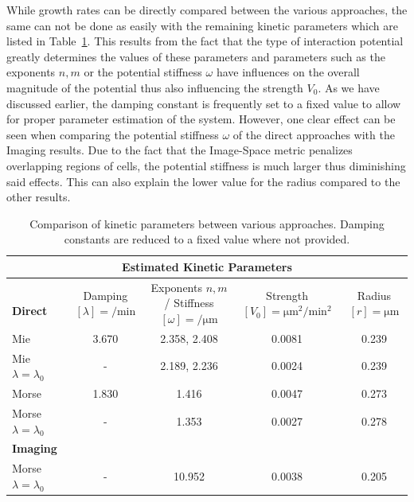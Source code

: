 While growth rates can be directly compared between the various approaches, the same
can not be done
as easily with the remaining kinetic parameters which are listed in
Table~\ref{tab:comparison-kinetic-parameters}.
This results from the fact that the type of interaction potential greatly determines
the values of
these parameters and parameters such as the exponents $n,m$ or the potential
stiffness $\omega$ have
influences on the overall magnitude of the potential thus also influencing the strength $V_0$.
As we have discussed earlier, the damping constant is frequently set to a fixed value
to allow for
proper parameter estimation of the system.
However, one clear effect can be seen when comparing the potential stiffness $\omega$
of the direct
approaches with the Imaging results.
Due to the fact that the Image-Space metric penalizes overlapping regions of cells,
the potential
stiffness is much larger thus diminishing said effects.
This can also explain the lower value for the radius compared to the other results.

\begin{table}[H]
    \centering
    \begin{tabular}{l c c c c}
        \multicolumn{5}{c}{Estimated Kinetic Parameters}\\
        \toprule
        \makecell[l]{\\\textbf{Direct}}
        & \makecell{Damping\\$[\lambda]=\unit{\per\minute}$}
        & \makecell{Exponents $n,m$/\\Stiffness $[\omega]=\unit{\per\micro\metre}$}
        & \makecell{Strength\\$[V_0]=\unit{\micro\metre^2\per\minute^2}$}
        & \makecell{Radius\\$[r]=\unit{\micro\metre}$}\\
        \midrule
        Mie                         & 3.670 & 2.358, 2.408 & 0.0081 & 0.239\\
        Mie $\lambda=\lambda_0$     & -     & 2.189, 2.236 & 0.0024 & 0.239\\
        Morse                       & 1.830 & 1.416 & 0.0047 & 0.273\\
        Morse $\lambda=\lambda_0$   & -     & 1.353 & 0.0027 & 0.278\\
        \textbf{Imaging}\\
        \midrule
        Morse $\lambda=\lambda_0$   & - & 10.952 & 0.0038 & 0.205\\
        \bottomrule
    \end{tabular}
    \caption{
        Comparison of kinetic parameters between various approaches.
        Damping constants are reduced to a fixed value where not provided.
    }
    \label{tab:comparison-kinetic-parameters}
\end{table}

